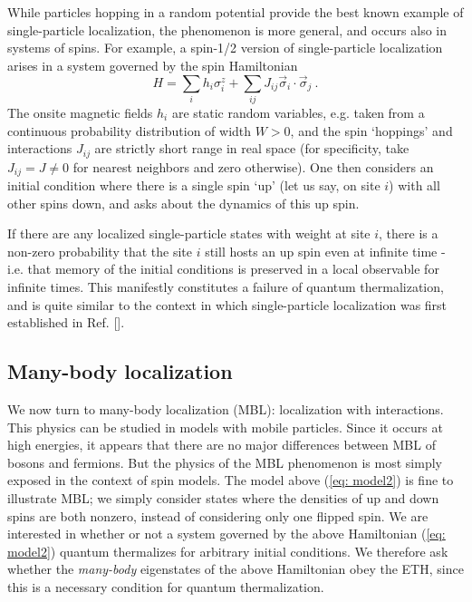 \documentclass[amsmath,onecolumn, superscriptaddress,preprint,aps]{revtex4}
\renewcommand{\cite}[1]{[\onlinecite{#1}]}
\begin{document}
While particles hopping in a random potential provide the best known example of single-particle localization, the phenomenon is more general,
and occurs also in systems of spins.  For example, a spin-1/2 version of single-particle localization arises in a system governed by the spin Hamiltonian
  \begin{equation}
  H = \sum_i h_i \sigma^z_i + \sum_{ij} J_{ij} \vec\sigma_i \cdot \vec\sigma_j ~. \label{eq: model2}
  \end{equation}
The onsite magnetic fields $h_i$ are static random variables, e.g. taken from a continuous probability distribution of width $W>0$, and the spin `hoppings' and interactions $J_{ij}$ are
strictly short range in real space (for specificity, take $J_{ij} = J \neq 0$ for nearest neighbors and zero otherwise).  One then considers an initial condition
where there is a single spin `up' (let us say, on site $i$) with all other spins down, and asks about the dynamics of this up spin.


If there are any localized single-particle states with weight at site $i$, there is a non-zero probability that the site $i$ still hosts an up spin even at infinite time - i.e. that memory of the initial conditions is preserved in a local observable for infinite times.  This manifestly constitutes a failure of quantum thermalization, and is quite similar to the context in which single-particle localization was first established in Ref. \cite{Anderson}.

  \subsection{Many-body localization}
  \label{mbl}
 We now turn to many-body localization (MBL): localization with interactions.  This physics can be studied in models with mobile particles.  Since it occurs at high
 energies, it appears that there are no major differences between MBL of bosons and fermions.
 But
  the physics of the MBL phenomenon is most simply exposed in the context of spin models.  The model above (\ref{eq: model2}) is fine to illustrate MBL; we simply
  consider states where the densities of up and down spins are both nonzero, instead of considering only one flipped spin.
We are interested in whether or not a system governed by the above Hamiltonian (\ref{eq: model2}) quantum thermalizes for arbitrary initial conditions.  We therefore ask whether the {\it many-body} eigenstates of the above Hamiltonian obey the ETH, since this is a necessary condition for quantum thermalization.
\end{document}
